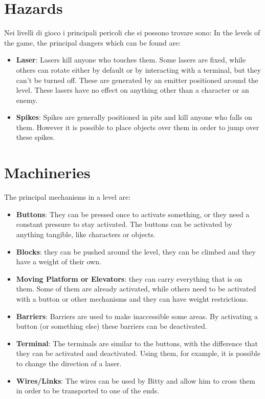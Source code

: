 \documentclass[12pt, a4paper]{report}
\begin{document}
\section*{Hazards}
Nei livelli di gioco i principali pericoli che si possono trovare sono:
In the levels of the game, the principal dangers which can be found are:
\begin{itemize}
	\item \textbf{Laser}: Lasers kill anyone who touches them. Some lasers are fixed, while others can rotate either by default or by interacting with a terminal, but they can't be turned off. These are generated by an emitter positioned around the level. These lasers have no effect on anything other than a character or an enemy.
	\item \textbf{Spikes}: Spikes are generally positioned in pits and kill anyone who falls on them. However it is possible to place objects over them in order to jump over these spikes.
\end{itemize}

\section*{Machineries}
The principal mechanisms in a level are:
\begin{itemize}
	\item \textbf{Buttons}: They can be pressed once to activate something, or they need a constant pressure to stay activated. The buttons can be activated by anything tangible, like characters or objects.
	\item \textbf{Blocks}: they can be pushed around the level, they can be climbed and they have a weight of their own.
	\item \textbf{Moving Platform or Elevators}: they can carry everything that is on them. Some of them are already activated, while others need to be activated with a button or other mechanisms and they can have weight restrictions.
	\item \textbf{Barriers}: Barriers are used to make inaccessible some areas. By activating a button (or something else) these barriers can be deactivated.
	\item \textbf{Terminal}: The terminals are similar to the buttons, with the difference that they can be activated and deactivated. Using them, for example, it is possible to change the direction of a laser.
	\item \textbf{Wires/Links}: The wires can be used by Bitty and allow him to cross them in order to be transported to one of the ends.
\end{itemize}
\end{document}
